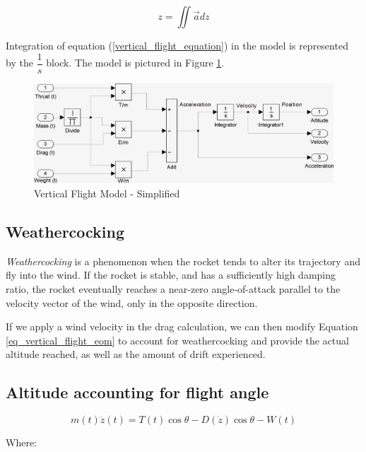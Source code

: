\documentclass[]{article}
\begin{document}
\begin{equation}
z = \iint \vec{a} dz
\end{equation}

Integration of equation (\ref{vertical_flight_equation}) in the model is
represented by the \(\dfrac{1}{s}\) block. The model is pictured in
Figure \ref{vertical_model_simplified}.

\begin{figure}[htbp]
\centering
\includegraphics{images/vertical_model_simplified.png}
\caption{Vertical Flight Model - Simplified
\label{vertical_model_simplified}}
\end{figure}

\subsection{Weathercocking}\label{weathercocking}

\emph{Weathercocking} is a phenomenon when the rocket tends to alter its
trajectory and fly into the wind. If the rocket is stable, and has a
sufficiently high damping ratio, the rocket eventually reaches a
near-zero angle-of-attack parallel to the velocity vector of the wind,
only in the opposite direction.

If we apply a wind velocity in the drag calculation, we can then modify
Equation \ref{eq_vertical_flight_eom} to account for weathercocking and
provide the actual altitude reached, as well as the amount of drift
experienced.

\subsection{Altitude accounting for flight
angle}\label{altitude-accounting-for-flight-angle}

\begin{equation}
\label{eq_vertical_angle}
m(t)\ddot{z}(t) = T(t) \cos \theta - D(\dot{z}) \cos \theta - W(t)
\end{equation}

Where:
\end{document}
